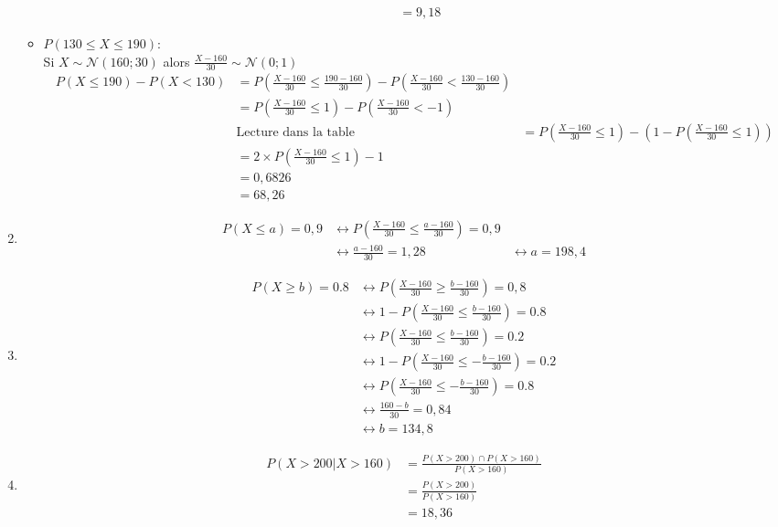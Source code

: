 \documentclass[12pt]{report}
\begin{document}
\begin{enumerate}
\begin{itemize}
\begin{align*}
                & = 9,18%
            \end{align*}
            \item $P(130 \leq X \leq 190)$:\\
            Si $X \sim \mathcal{N}(160;30)$ alors $\frac{X-160}{30} \sim \mathcal{N}(0;1)$\\
            \begin{align*}
                P(X \leq 190) - P(X < 130) &= P(\frac{X-160}{30} \leq \frac{190-160}{30}) - P(\frac{X-160}{30} < \frac{130-160}{30}) \\
                &= P(\frac{X-160}{30} \leq 1) - P(\frac{X-160}{30} <-1)\\
                & \text{Lecture dans la table}
                &= P(\frac{X-160}{30} \leq 1) - (1- P(\frac{X-160}{30} \leq 1))\\
                &= 2 \times P(\frac{X-160}{30} \leq 1) -1\\
                &=0,6826\\
                & = 68,26%
            \end{align*}
        \end{itemize} 
    \item\begin{align*}
        P(X \leq a) =  0,9 &\leftrightarrow P(\frac{X-160}{30} \leq \frac{a-160}{30}) =0,9\\
        &\leftrightarrow  \frac{a-160}{30}  = 1,28
        &\leftrightarrow a = 198,4
    \end{align*}
    \item \begin{align*}
        P(X \geq b) = 0.8  &\leftrightarrow P(\frac{X-160}{30} \geq \frac{b-160}{30}) =0,8\\
        &\leftrightarrow 1 - P(\frac{X-160}{30} \leq \frac{b-160}{30}) = 0.8\\
        &\leftrightarrow P(\frac{X-160}{30} \leq \frac{b-160}{30}) = 0.2\\
        &\leftrightarrow 1 - P(\frac{X-160}{30} \leq -\frac{b-160}{30}) = 0.2\\
        &\leftrightarrow P(\frac{X-160}{30} \leq -\frac{b-160}{30}) = 0.8\\
        &\leftrightarrow  \frac{160-b}{30}  = 0,84\\
        &\leftrightarrow b = 134,8
    \end{align*}
    \item \begin{align*}
        P(X >200 | X>160) &= \frac{P(X>200) \cap P(X>160)}{P(X>160)}\\
        &= \frac{P(X > 200)}{P(X > 160)}\\
        &= 18,36%
    \end{align*}
\end{enumerate}
\end{document}
